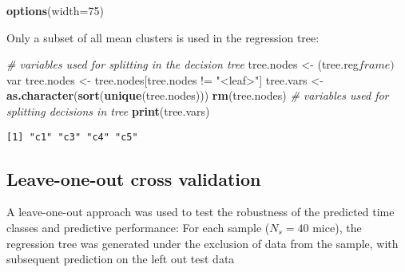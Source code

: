 \documentclass[]{article}
\newenvironment{Shaded}{\begin{snugshade}}{\end{snugshade}}
\newcommand{\KeywordTok}[1]{\textcolor[rgb]{0.13,0.29,0.53}{\textbf{{#1}}}}
\newcommand{\DataTypeTok}[1]{\textcolor[rgb]{0.13,0.29,0.53}{{#1}}}
\newcommand{\DecValTok}[1]{\textcolor[rgb]{0.00,0.00,0.81}{{#1}}}
\newcommand{\StringTok}[1]{\textcolor[rgb]{0.31,0.60,0.02}{{#1}}}
\newcommand{\CommentTok}[1]{\textcolor[rgb]{0.56,0.35,0.01}{\textit{{#1}}}}
\newcommand{\NormalTok}[1]{{#1}}
\begin{document}
\begin{Shaded}
\begin{Highlighting}[]
\KeywordTok{options}\NormalTok{(}\DataTypeTok{width=}\DecValTok{75}\NormalTok{)}
\end{Highlighting}
\end{Shaded}

\normalsize

Only a subset of all mean clusters is used in the regression tree:

\begin{Shaded}
\begin{Highlighting}[]
\CommentTok{# variables used for splitting in the decision tree}
\NormalTok{tree.nodes <-}\StringTok{ }\NormalTok{(tree.reg$frame)$var}
\NormalTok{tree.nodes <-}\StringTok{ }\NormalTok{tree.nodes[tree.nodes !=}\StringTok{ "<leaf>"}\NormalTok{]}
\NormalTok{tree.vars <-}\StringTok{ }\KeywordTok{as.character}\NormalTok{(}\KeywordTok{sort}\NormalTok{(}\KeywordTok{unique}\NormalTok{(tree.nodes)))}
\KeywordTok{rm}\NormalTok{(tree.nodes)}
\CommentTok{# variables used for splitting decisions in tree}
\KeywordTok{print}\NormalTok{(tree.vars)}
\end{Highlighting}
\end{Shaded}

\begin{verbatim}
[1] "c1" "c3" "c4" "c5"
\end{verbatim}

\subsection{Leave-one-out cross
validation}\label{leave-one-out-cross-validation}

A leave-one-out approach was used to test the robustness of the
predicted time classes and predictive performance: For each sample
(\(N_{s}=40\) mice), the regression tree was generated under the
exclusion of data from the sample, with subsequent prediction on the
left out test data
\end{document}
